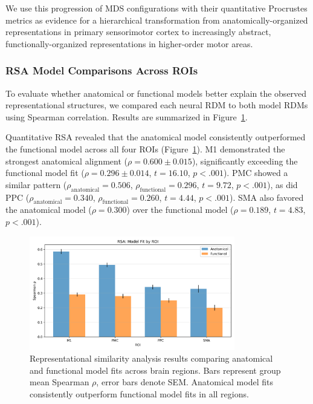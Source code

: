 \documentclass{article}
\begin{document}
We use this progression of MDS configurations with their quantitative Procrustes metrics as evidence for a hierarchical transformation from anatomically-organized representations in primary sensorimotor cortex to increasingly abstract, functionally-organized representations in higher-order motor areas.

\subsubsection{RSA Model Comparisons Across ROIs}
To evaluate whether anatomical or functional models better explain the observed representational structures, we compared each neural RDM to both model RDMs using Spearman correlation. Results are summarized in Figure~\ref{fig:rsa}.

Quantitative RSA revealed that the anatomical model consistently outperformed the functional model across all four ROIs (Figure~\ref{fig:rsa}). M1 demonstrated the strongest anatomical alignment (\(\rho = 0.600 \pm 0.015\)), significantly exceeding the functional model fit (\(\rho = 0.296 \pm 0.014\), \(t = 16.10\), \(p < .001\)). PMC showed a similar pattern (\(\rho_{\text{anatomical}} = 0.506\), \(\rho_{\text{functional}} = 0.296\), \(t = 9.72\), \(p < .001\)), as did PPC (\(\rho_{\text{anatomical}} = 0.340\), \(\rho_{\text{functional}} = 0.260\), \(t = 4.44\), \(p < .001\)). SMA also favored the anatomical model (\(\rho = 0.300\)) over the functional model (\(\rho = 0.189\), \(t = 4.83\), \(p < .001\)).

\begin{figure}[!htbp]
\centering
\includegraphics[width=0.8\textwidth]{results/rsa_model_fit_by_roi.png}
\caption{Representational similarity analysis results comparing anatomical and functional model fits across brain regions. Bars represent group mean Spearman \(\rho\), error bars denote SEM. Anatomical model fits consistently outperform functional model fits in all regions.}
\label{fig:rsa}
\end{figure}
\end{document}
